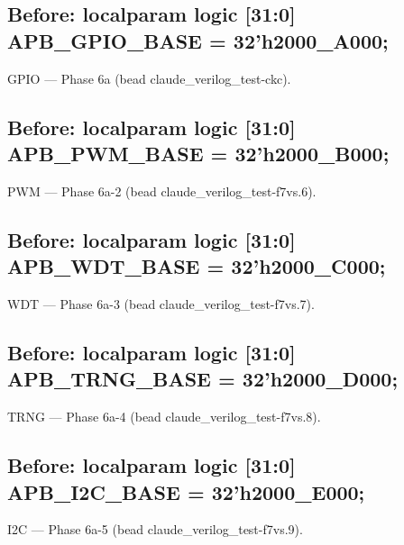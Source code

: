 \begin{record}

\subsection*{Before: localparam logic [31:0] APB\_GPIO\_BASE   = 32'h2000\_A000;}

\begin{textblock}
GPIO — Phase 6a (bead claude_verilog_test-ckc).
\end{textblock}

\subsection*{Before: localparam logic [31:0] APB\_PWM\_BASE    = 32'h2000\_B000;}

\begin{textblock}
PWM — Phase 6a-2 (bead claude_verilog_test-f7vs.6).
\end{textblock}

\subsection*{Before: localparam logic [31:0] APB\_WDT\_BASE    = 32'h2000\_C000;}

\begin{textblock}
WDT — Phase 6a-3 (bead claude_verilog_test-f7vs.7).
\end{textblock}

\subsection*{Before: localparam logic [31:0] APB\_TRNG\_BASE   = 32'h2000\_D000;}

\begin{textblock}
TRNG — Phase 6a-4 (bead claude_verilog_test-f7vs.8).
\end{textblock}

\subsection*{Before: localparam logic [31:0] APB\_I2C\_BASE    = 32'h2000\_E000;}

\begin{textblock}
I2C — Phase 6a-5 (bead claude_verilog_test-f7vs.9).
\end{textblock}


\end{record}
